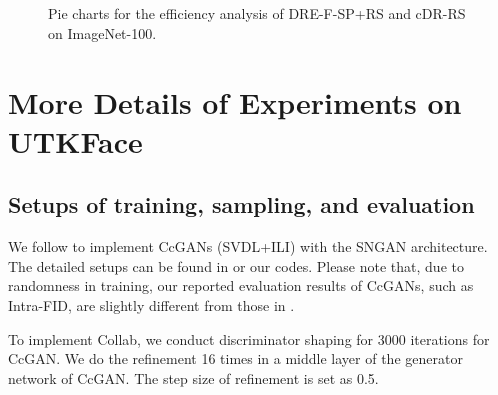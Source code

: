 \documentclass[final,12pt, 3p,times]{elsarticle}
\begin{document}
\begin{figure}[h]
	\centering
	\quad
	\\
	\quad
	\\
	\quad
	\caption{Pie charts for the efficiency analysis of DRE-F-SP+RS and cDR-RS on ImageNet-100.}
	\label{fig:ImageNet-100_efficiency_analysis_pie_charts}
\end{figure}





\section{More Details of Experiments on UTKFace}\label{supp:details_of_utkface}

\subsection{Setups of training, sampling, and evaluation}

We follow \cite{ding2021ccgan, ding2020continuous} to implement CcGANs (SVDL+ILI) with the SNGAN architecture. The detailed setups can be found in \cite{ding2021ccgan, ding2020continuous} or our codes. Please note that, due to randomness in training, our reported evaluation results of CcGANs, such as Intra-FID, are slightly different from those in \cite{ding2021ccgan, ding2020continuous}. 

To implement Collab, we conduct discriminator shaping for 3000 iterations for CcGAN. We do the refinement 16 times in a middle layer of the generator network of CcGAN. The step size of refinement is set as 0.5. 
\end{document}

